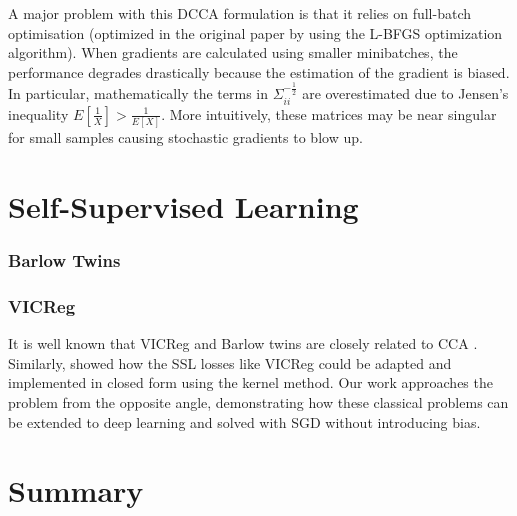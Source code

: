 A major problem with this DCCA formulation is that it relies on full-batch optimisation (optimized in the original paper by using the L-BFGS optimization algorithm). When gradients are calculated using smaller minibatches, the performance degrades drastically because the estimation of the gradient is biased. In particular, mathematically the terms in $\Sigma_{ii}^{-\frac{1}{2}}$ are overestimated due to Jensen's inequality $E[\frac{1}{X}]>\frac{1}{E[X]}$. More intuitively, these matrices may be near singular for small samples causing stochastic gradients to blow up.


\section{Self-Supervised Learning}

\subsubsection{Barlow Twins}

\subsubsection{VICReg}


It is well known that VICReg and Barlow twins are closely related to CCA \cite{balestriero2022contrastive}. Similarly, \cite{kiani2022joint} showed how the SSL losses like VICReg could be adapted and implemented in closed form using the kernel method. Our work approaches the problem from the opposite angle, demonstrating how these classical problems can be extended to deep learning and solved with SGD without introducing bias.


\section{Summary}